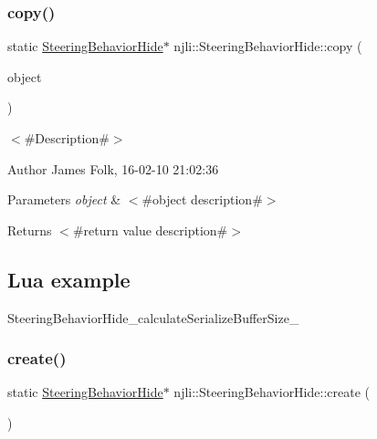 \subsubsection{\texorpdfstring{copy()}{copy()}}
{\footnotesize\ttfamily static \mbox{\hyperlink{classnjli_1_1_steering_behavior_hide}{Steering\+Behavior\+Hide}}$\ast$ njli\+::\+Steering\+Behavior\+Hide\+::copy (\begin{DoxyParamCaption}\item[{const \mbox{\hyperlink{classnjli_1_1_steering_behavior_hide}{Steering\+Behavior\+Hide}} \&}]{object }\end{DoxyParamCaption})\hspace{0.3cm}{\ttfamily [static]}}



$<$\#\+Description\#$>$ 

\begin{DoxyAuthor}{Author}
James Folk, 16-\/02-\/10 21\+:02\+:36
\end{DoxyAuthor}

\begin{DoxyParams}{Parameters}
{\em object} & $<$\#object description\#$>$\\
\hline
\end{DoxyParams}
\begin{DoxyReturn}{Returns}
$<$\#return value description\#$>$
\end{DoxyReturn}
\hypertarget{classnjli_1_1_steering_behavior_wander_ex1}{}\subsection{Lua example}\label{classnjli_1_1_steering_behavior_wander_ex1}

\begin{DoxyCodeInclude}
\end{DoxyCodeInclude}
Steering\+Behavior\+Hide\+\_\+calculate\+Serialize\+Buffer\+Size\+\_\+ \mbox{\label{classnjli_1_1_steering_behavior_hide_a1ab4df55dc2a32fd856bc918efe77eed}} 
\subsubsection{\texorpdfstring{create()}{create()}\hspace{0.1cm}{\footnotesize\ttfamily [1/2]}}
{\footnotesize\ttfamily static \mbox{\hyperlink{classnjli_1_1_steering_behavior_hide}{Steering\+Behavior\+Hide}}$\ast$ njli\+::\+Steering\+Behavior\+Hide\+::create (\begin{DoxyParamCaption}{ }\end{DoxyParamCaption})\hspace{0.3cm}{\ttfamily [static]}}



